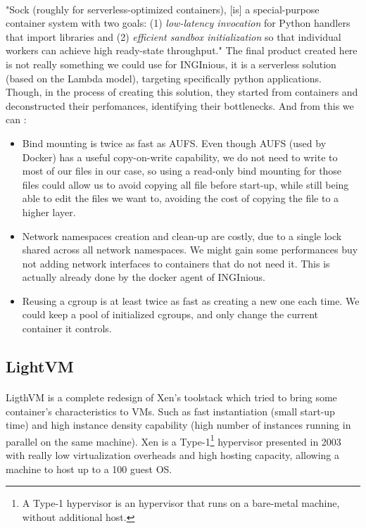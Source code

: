 \paragraph{}"Sock (roughly for serverless-optimized containers), [is] a special-purpose container system with two goals: (1) \textit{low-latency invocation} for Python handlers that import libraries and (2) \textit{efficient sandbox initialization} so that individual workers can achieve high ready-state throughput." \cite{oakes2018sock}  The final product created here is not really something we could use for INGInious, it is a serverless solution (based on the Lambda model), targeting specifically python applications.  Though, in the process of creating this solution, they started from containers and deconstructed their perfomances, identifying their bottlenecks.  And from this we can :
\begin{itemize}
\renewcommand\labelitemi{--}
  \item Bind mounting is twice as fast as AUFS.  Even though AUFS (used by Docker) has a useful copy-on-write capability, we do not need to write to most of our files in our case, so using a read-only bind mounting for those files could allow us to avoid copying all file before start-up, while still being able to edit the files we want to, avoiding the cost of copying the file to a higher layer.
  \item Network namespaces creation and clean-up are costly, due to a single lock shared across all network namespaces.  We might gain some performances buy not adding network interfaces to containers that do not need it.  This is actually already done by the docker agent of INGInious.
  \item Reusing a cgroup is at least twice as fast as creating a new one each time.  We could keep a pool of initialized cgroups, and only change the current container it controls.
\end{itemize}

\subsection{LightVM} 
\paragraph{}LigthVM is a complete redesign of Xen's toolstack which tried to bring some container's characteristics to VMs.  Such as fast instantiation (small start-up time) and high instance density capability (high number of instances running in parallel on the same machine).\cite{manco2017my}  Xen is a Type-1\footnote{A Type-1 hypervisor is an hypervisor that runs on a bare-metal machine, without additional host.} hypervisor presented in 2003 with really low virtualization overheads and high hosting capacity, allowing a machine to host up to a 100 guest OS.\cite{barham2003xen}  
